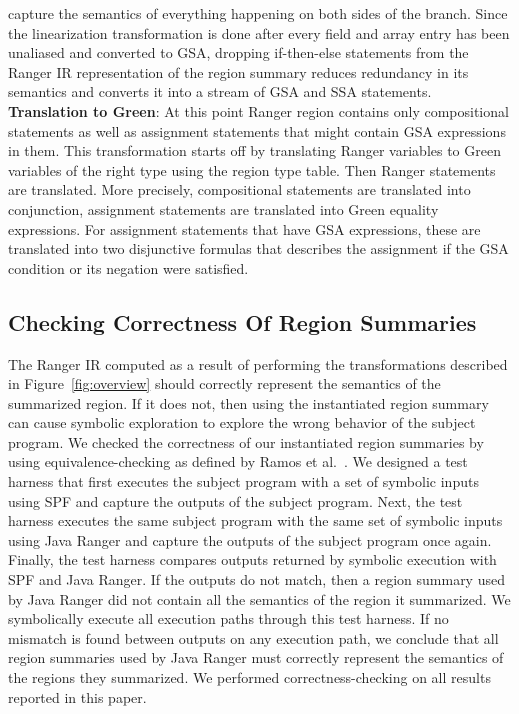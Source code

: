 capture the semantics of everything happening on both sides of the branch.
%
Since the linearization transformation is done after every field and array entry has been unaliased and converted to
GSA, dropping if-then-else statements from the Ranger IR representation of the region summary reduces redundancy in its
semantics and converts it into a stream of GSA and SSA statements.\\
\textbf{Translation to Green}:
%
At this point Ranger region contains only compositional statements as well as assignment statements that might contain GSA expressions in them.
%
This transformation starts off by translating Ranger variables to Green variables of the right type using the region type table.
%
Then Ranger statements are translated. More precisely, compositional statements are translated into conjunction, assignment statements are translated into Green equality expressions.
%
For assignment statements that have GSA expressions, these are translated into two disjunctive formulas that describes the assignment if the GSA condition or its negation were satisfied. 

\subsection{Checking Correctness Of Region Summaries}
The Ranger IR computed as a result of performing the transformations described in Figure~\ref{fig:overview} should
correctly represent the semantics of the summarized region.
%
If it does not, then using the instantiated region summary can cause symbolic exploration to explore the wrong behavior
of the subject program.
%
We checked the correctness of our instantiated region summaries by using equivalence-checking as defined by Ramos et al.~\cite{ramos}.
%
We designed a test harness that first executes the subject program with a set of symbolic inputs using SPF and
capture the outputs of the subject program.
%
Next, the test harness executes the same subject program with the same set of symbolic inputs using Java Ranger and
capture the outputs of the subject program once again.
%
Finally, the test harness compares outputs returned by symbolic execution with SPF and Java Ranger.
%
If the outputs do not match, then a region summary used by Java Ranger did not contain all the semantics
of the region it summarized.
%
We symbolically execute all execution paths through this test harness.
%
If no mismatch is found between outputs on any execution path, we conclude that all region summaries used by Java Ranger
must correctly represent the semantics of the regions they summarized.
%
We performed correctness-checking on all results reported in this paper.
